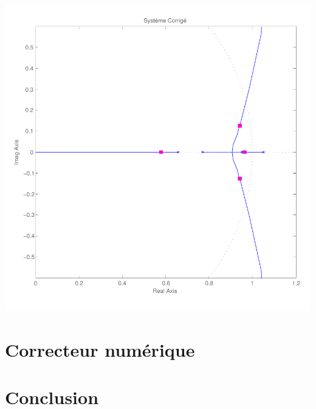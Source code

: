 \documentclass[11pt, french]{article} %
\begin{document}
\includegraphics[scale=0.50]{RLN_Sys_AvPh_K5.pdf}

\section{Correcteur numérique}
\section{Conclusion}
\end{document}

